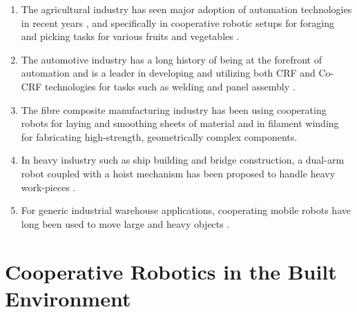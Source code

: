     \begin{enumerate}
        \item  The agricultural industry has seen major adoption of automation technologies in recent years \citep{lytridis_overview_2021}, and specifically in cooperative robotic setups for foraging and picking tasks for various fruits and vegetables \citep{sepulveda_robotic_2020, sarabu_graph-based_2019, ahlin_apple_2017,ling_dual-arm_2019}.
        \item The automotive industry has a long history of being at the forefront of automation and is a leader in developing and utilizing both CRF and Co-CRF technologies \citep{michalos_automotive_2010} for tasks such as welding \citep{pellegrinelli_multi-robot_2017, wu_redundancy_2000, papakostas_industrial_2011} and panel assembly \citep{connolly_motoman_2009}.
        \item The fibre composite manufacturing industry has been using cooperating robots for laying and smoothing sheets of material \citep{szcesny_advanced_2017, malhan_hybrid_2018} and in filament winding \citep{sbanca_winding_2015} for fabricating high-strength, geometrically complex components.
        \item  In heavy industry such as ship building and bridge construction, a dual-arm robot coupled with a hoist mechanism has been proposed to handle heavy work-pieces \citep{shinohara_heavy_2001}.
        \item  For generic industrial warehouse applications, cooperating mobile robots have long been used to move large and heavy objects \citep{mataric_cooperative_1995,hirata_coordinated_2000}.
    \end{enumerate}


\section{Cooperative Robotics in the Built Environment}\label{sec:02_built}

